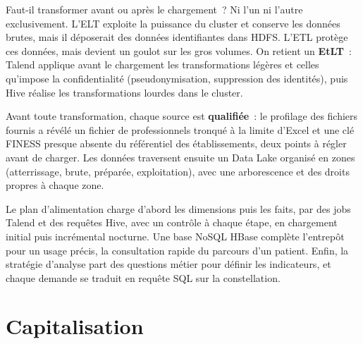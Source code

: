 \vspace{0.2cm}

\noindent Faut-il transformer avant ou après le chargement~? Ni l'un ni l'autre exclusivement. L'ELT exploite la puissance du cluster et conserve les données brutes, mais il déposerait des données identifiantes dans HDFS. L'ETL protège ces données, mais devient un goulot sur les gros volumes. On retient un \textbf{EtLT}~: Talend applique avant le chargement les transformations légères et celles qu'impose la confidentialité (pseudonymisation, suppression des identités), puis Hive réalise les transformations lourdes dans le cluster.

\vspace{0.2cm}

\noindent Avant toute transformation, chaque source est \textbf{qualifiée}~: le profilage des fichiers fournis a révélé un fichier de professionnels tronqué à la limite d'Excel et une clé FINESS presque absente du référentiel des établissements, deux points à régler avant de charger. Les données traversent ensuite un Data Lake organisé en zones (atterrissage, brute, préparée, exploitation), avec une arborescence et des droits propres à chaque zone.

\vspace{0.2cm}

\noindent Le plan d'alimentation charge d'abord les dimensions puis les faits, par des jobs Talend et des requêtes Hive, avec un contrôle à chaque étape, en chargement initial puis incrémental nocturne. Une base NoSQL HBase complète l'entrepôt pour un usage précis, la consultation rapide du parcours d'un patient. Enfin, la stratégie d'analyse part des questions métier pour définir les indicateurs, et chaque demande se traduit en requête SQL sur la constellation.

\newpage
\section*{Capitalisation}
{}


